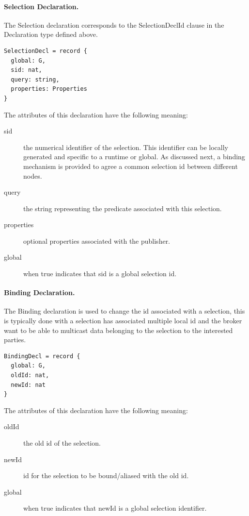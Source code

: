 \documentclass[a4paper,oneside,article]{memoir}
\begin{document}
\paragraph{Selection Declaration.} The Selection declaration corresponds to the SelectionDeclId
clause in the Declaration type defined above.
\begin{verbatim}
SelectionDecl = record {
  global: G,
  sid: nat,
  query: string,
  properties: Properties
}
\end{verbatim}
The attributes of this declaration have the following meaning:
\begin{description}
\item[sid] the numerical identifier of the selection.  This identifier can be locally generated and
  specific to a runtime or global.  As discussed next, a binding mechanism is provided to agree a
  common selection id between different nodes.
\item[query] the string representing the predicate associated with this selection.
\item[properties] optional properties associated with the publisher.
\item[global] when true indicates that sid is a global selection id.
\end{description}

\paragraph{Binding Declaration.} The Binding declaration is used to change the id associated with a
selection, this is typically done with a selection has associated multiple local id and the broker
want to be able to multicast data belonging to the selection to the interested parties.
\begin{verbatim}
BindingDecl = record {
  global: G,
  oldId: nat,
  newId: nat
}
\end{verbatim}
The attributes of this declaration have the following meaning:
\begin{description}
\item[oldId] the old id of the selection.
\item[newId] id for the selection to be bound/aliased with the old id.
\item[global] when true indicates that newId is a global selection identifier.
\end{description}
\end{document}
